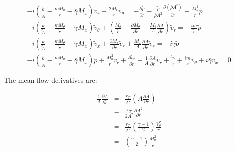\documentclass[12pt]{article}
\begin{document}
\begin{small}
\begin{eqnarray}
-i
\left(
 \frac{k}{ \widetilde{A}}
- \frac{ m M_{\theta} }{\widetilde{r}}
- \overline{\gamma} M_x  
\right) \widetilde{v}_r 
-\frac{2 M_{\theta}}{\widetilde{r}} \widetilde{v}_{\theta} 
 = 
-
\frac{\partial \widetilde{p} }{\partial \widetilde{r}} 
-\frac{\widetilde{p}}{\overline{\rho} A^2} 
\frac{\partial \left(\overline{\rho} A^2 \right) }{\partial \widetilde{r}} 
+
\frac{M_{\theta}^2 }{\widetilde{r}} 
\widetilde{p} 
\nonumber
\\
-i
\left(
\frac{k}{\widetilde{A}}
- \frac{ m M_{\theta} }{\widetilde{r} }
- \overline{\gamma} M_x  
\right) \widetilde{v}_{\theta} 
+
\left(
\frac{M_{\theta} }{\widetilde{r}}
+
\frac{\partial M_{\theta} }{\partial \widetilde{r}}
+
\frac{M_{\theta}}{A}
\frac{\partial A }{\partial \widetilde{r}}
\right) \widetilde{v}_r
 = 
-\frac{i m }{\widetilde{r} } \widetilde{p}
\nonumber
\\
-i
\left(
\frac{k}{\widetilde{A}}
- \frac{ m M_{\theta} }{\widetilde{r} }
- \overline{\gamma} M_x
\right) \widetilde{v}_x 
+
\frac{\partial M_x }{\partial \widetilde{r}} 
\widetilde{v}_r
+
\frac{M_x}{A}
\frac{\partial A }{\partial \widetilde{r}} 
\widetilde{v}_r
 = 
-i \overline{\gamma} \widetilde{p}
\nonumber
\\
-i
\left(
\frac{k}{\widetilde{A}}
- \frac{ m M_{\theta}}{\widetilde{r} } 
-  \overline{\gamma} M_x
\right) \widetilde{p}
+\frac{M_{\theta}^2 }{ \widetilde{r} }
\widetilde{v}_r 
+ 
\frac{\partial \widetilde{v}_r }{\partial \widetilde{r}}
+ 
\frac{1}{A}
\frac{\partial A }{\partial \widetilde{r}}
\widetilde{v}_r
+ 
\frac{\widetilde{v}_r }{\widetilde{r}} 
+\frac{i m }{\widetilde{r}} \widetilde{v}_{\theta} 
+ i \overline{\gamma} \widetilde{v}_x 
 = 
0
\nonumber
\end{eqnarray}
\end{small}%

The mean flow derivatives are:

\begin{eqnarray}
\frac{1}{A} \frac{\partial A}{\partial \widetilde{r}}
&=&
\frac{r_T}{A^2} \left(A \frac{\partial A}{\partial r} \right)
\nonumber
\\
&=&
\frac{r_T}{2 A^2} \frac{\partial A^2}{\partial r}
\nonumber
\\
&=&
\frac{r_T }{A^2}
\left(\frac{\gamma - 1}{2} \right) \frac{V_{\theta}^2}{r }
\nonumber
\\
&=&
\left(\frac{\gamma - 1}{2} \right) \frac{M_{\theta}^2}{\widetilde{r}}
\nonumber
\end{eqnarray}
\end{document}
